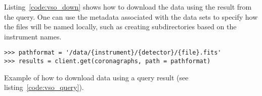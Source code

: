 Listing~\ref{code:vso_down} shows how to download the data using the result
from the query.
One can use the metadata associated with the data sets to specify how the
files will be named locally, such as creating subdirectories based on the
instrument names.

\begin{listing}[h]
\begin{verbatim}
>>> pathformat = '/data/{instrument}/{detector}/{file}.fits'
>>> results = client.get(coronagraphs, path = pathformat)
\end{verbatim}
\caption{Example of how to download data using a query result (see
listing~\ref{code:vso_query}).}
\label{code:vso_down}
\end{listing}
